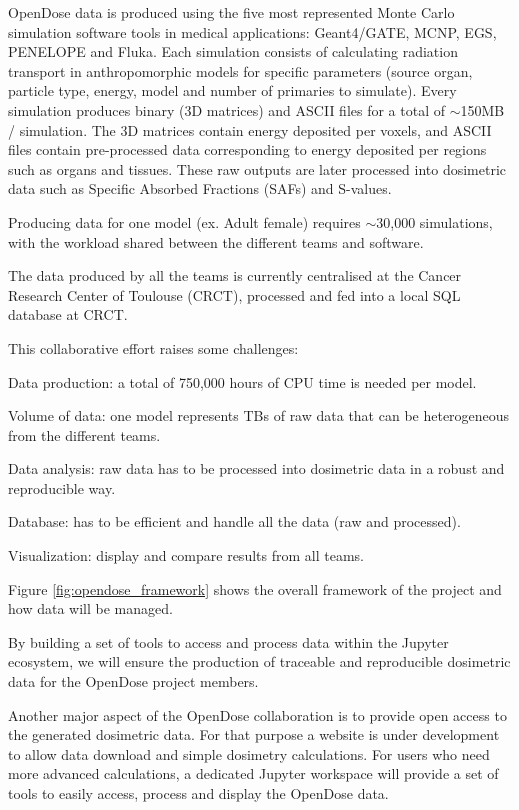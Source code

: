   OpenDose data is produced using the five most represented Monte Carlo
  simulation software tools in medical applications: Geant4/GATE, MCNP, EGS, PENELOPE
  and Fluka. Each simulation consists of calculating radiation transport in
  anthropomorphic models for specific parameters (source organ, particle type,
  energy, model and number of primaries to simulate). Every simulation produces
  binary (3D matrices) and ASCII files for a total of $\sim$150MB / simulation.
  The 3D matrices contain energy deposited per voxels, and ASCII files contain
  pre-processed data corresponding to energy deposited per regions such as
  organs and tissues. These raw outputs are later processed into dosimetric
  data such as Specific Absorbed Fractions (SAFs) and S-values.

  Producing data for one model (ex. Adult female) requires $\sim$30,000
  simulations, with the workload shared between the different teams and
  software.

  The data produced by all the teams is currently centralised at the Cancer
  Research Center of Toulouse (CRCT), processed and fed into a local SQL
  database at CRCT.

  This collaborative effort raises some challenges:
  \begin{compactitem}
  \item Data production: a total of 750,000 hours of CPU time is needed per
    model.
  \item Volume of data: one model represents TBs of raw data that can be
    heterogeneous from the different teams.
  \item Data analysis: raw data has to be processed into dosimetric data in a
    robust and reproducible way.
  \item Database: has to be efficient and handle all the data (raw and
    processed).
  \item Visualization: display and compare results from all teams.
  \end{compactitem}

  Figure \ref{fig:opendose_framework} shows the overall framework of the
  project and how data will be managed.

  By building a set of tools to access and process data within the Jupyter
  ecosystem, we will ensure the production of traceable and reproducible
  dosimetric data for the OpenDose project members.

  Another major aspect of the OpenDose collaboration is to provide open
  access to the generated dosimetric data. For that purpose a website is under
  development to allow data download and simple dosimetry calculations. For
  users who need more advanced calculations, a dedicated Jupyter workspace will
  provide a set of tools to easily access, process and display the OpenDose
  data.

